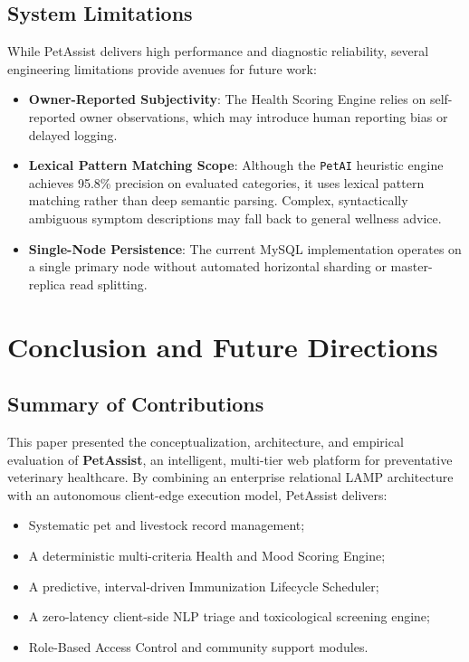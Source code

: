 \documentclass[conference]{IEEEtran}
\begin{document}
\subsection{System Limitations}
While PetAssist delivers high performance and diagnostic reliability, several engineering limitations provide avenues for future work:
\begin{itemize}
    \item \textbf{Owner-Reported Subjectivity}: The Health Scoring Engine relies on self-reported owner observations, which may introduce human reporting bias or delayed logging.
    \item \textbf{Lexical Pattern Matching Scope}: Although the \texttt{PetAI} heuristic engine achieves 95.8\% precision on evaluated categories, it uses lexical pattern matching rather than deep semantic parsing. Complex, syntactically ambiguous symptom descriptions may fall back to general wellness advice.
    \item \textbf{Single-Node Persistence}: The current MySQL implementation operates on a single primary node without automated horizontal sharding or master-replica read splitting.
\end{itemize}

\section{Conclusion and Future Directions}
\subsection{Summary of Contributions}
This paper presented the conceptualization, architecture, and empirical evaluation of \textbf{PetAssist}, an intelligent, multi-tier web platform for preventative veterinary healthcare. By combining an enterprise relational LAMP architecture with an autonomous client-edge execution model, PetAssist delivers:
\begin{itemize}
    \item Systematic pet and livestock record management;
    \item A deterministic multi-criteria Health and Mood Scoring Engine;
    \item A predictive, interval-driven Immunization Lifecycle Scheduler;
    \item A zero-latency client-side NLP triage and toxicological screening engine;
    \item Role-Based Access Control and community support modules.
\end{itemize}
\end{document}
